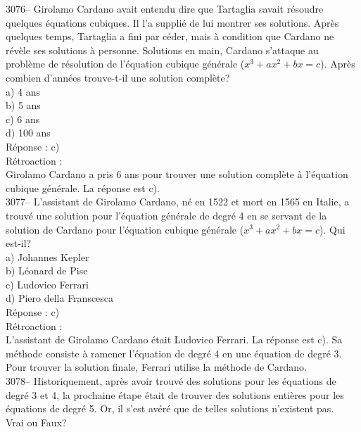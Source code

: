 \documentclass[letterpaper, 12pt]{article}
\begin{document}
3076-- Girolamo Cardano avait entendu dire que Tartaglia savait r\'esoudre quelques \'equations cubiques. Il l'a suppli\'e de lui montrer ses solutions. Apr\`es quelques temps, Tartaglia a fini par c\'eder, mais \`a condition que Cardano ne r\'ev\`ele ses solutions \`a personne. Solutions en main, Cardano s'attaque au probl\`eme de r\'esolution de l'\'equation cubique g\'en\'erale ($x^{3} + ax^{2} + bx =c$). Apr\`es combien d'ann\'ees trouve-t-il une solution compl\`ete?\\

a) 4 ans\\
b) 5 ans\\
c) 6 ans\\
d) 100 ans\\

R\'eponse : c)\\

R\'etroaction :\\
Girolamo Cardano a pris 6 ans pour trouver une solution compl\`ete \`a l'\'equation cubique g\'en\'erale. La r\'eponse est c).\\



3077-- L'assistant de Girolamo Cardano, n\'e en 1522 et mort en 1565 en Italie, a trouv\'e une solution pour l'\'equation g\'en\'erale de degr\'e 4 en se servant de la solution de Cardano pour l'\'equation cubique g\'en\'erale ($x^{3} + ax^{2} + bx =c$). Qui est-il?\\

a) Johannes Kepler\\
b) L\'eonard de Pise\\
c) Ludovico Ferrari\\
d) Piero della Franscesca\\

R\'eponse : c)\\

R\'etroaction :\\
L'assistant de Girolamo Cardano \'etait Ludovico Ferrari. La r\'eponse est c). Sa m\'ethode consiste \`a ramener l'\'equation de degr\'e 4 en une \'equation de degr\'e 3. Pour trouver la solution finale, Ferrari utilise la m\'ethode de Cardano.\\



3078-- Historiquement, apr\`es avoir trouv\'e des solutions pour les \'equations de degr\'e 3 et 4, la prochaine \'etape \'etait de trouver des solutions enti\`eres pour les \'equations de degr\'e 5. Or, il s'est av\'er\'e que de telles solutions n'existent pas.\\
Vrai ou Faux?\\
\end{document}
